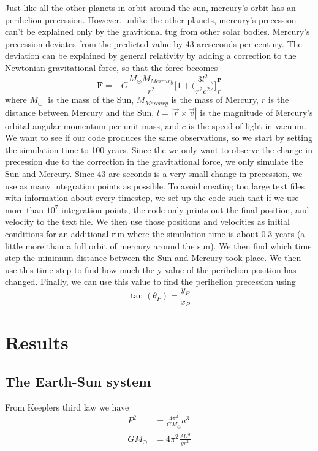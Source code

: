 \documentclass{article}
\begin{document}
\begin{multicols}{2}
Just like all the other planets in orbit around the sun, mercury's orbit has an perihelion precession. However, unlike the other planets, mercury's precession can't be explained only by the gravitional tug from other solar bodies. Mercury's precession deviates from the predicted value by 43 arcseconds per century. The deviation can be explained by general relativity by adding a correction to the Newtonian gravitational force, so that the force becomes
\begin{equation}
\mathbf{F}=-G\frac{M_{\odot}M_{Mercury}}{r^2}\Bigg[1+\Bigg(\frac{3l^2}{r^2c^2}\bigg)\bigg]\frac{\mathbf{r}}{r} \label{eq:relcor}
\end{equation}
where $M_\odot\ $ is the mass of the Sun, $M_{Mercury}$ is the mass of Mercury, $r$ is the distance between Mercury and the Sun, $l = |\vec{r} \times \vec{v}|$ is the magnitude of Mercury’s orbital angular momentum per unit mass, and $c$ is the speed of light in vacuum. We want to see if our code produces the same observations, so we start by setting the simulation time to 100 years. Since the we only want to observe the change in precession due to the correction in the gravitational force, we only simulate the Sun and Mercury. Since 43 arc seconds is a very small change in precession, we use as many integration points as possible. To avoid creating too large text files with information about every timestep, we set up the code such that if we use more than $10^7$ integration points, the code only prints out the final position, and velocity to the text file. We then use those positions and velocities as initial conditions for an additional run where the simulation time is about 0.3 years (a little more than a full orbit of mercury around the sun). We then find which time step the minimum distance between the Sun and Mercury took place. We then use this time step to find how much the y-value of the perihelion position has changed. Finally, we can use this value to find the perihelion precession using
\begin{equation}
\tan(\theta_P) = \frac{y_P}{x_P}
\end{equation}

\section{Results}
\subsection{The Earth-Sun system}
From Keeplers third law we have
\begin{align}
    P^2&=\frac{4\pi^2}{GM_\odot}a^3\\
    GM_\odot&=4\pi^2\frac{AU^3}{yr^2}
\end{align}

\end{multicols}
\end{document}

